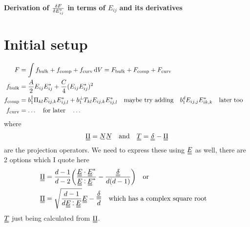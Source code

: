 \documentclass{article}
\newcommand\barbelow[1]{\stackunder[1.2pt]{$#1$}{\rule{1.5ex}{.1ex}}}
\newcommand{\su}[1]{\barbelow{#1}}
\newcommand{\du}[1]{\barbelow{\barbelow{#1}}}
\def\onedot{$\mathsurround0pt\ldotp$}
\def\cddot{\mathbin{
    \vcenter{\baselineskip1ex \vspace{-0.1ex}\hbox{\onedot}\hbox{\onedot}}
}}
\begin{document}
\begin{center}
    \LARGE
    \textbf{Derivation of $\fdv{F}{E_{ij}^*}$ in terms of $E_{ij}$ and its derivatives}
\end{center}
\vspace{1em}
\section{Initial setup}
\begin{align}
    F & = \int f_\text{bulk} + f_\text{comp} + f_\text{curv} \dd{V} = F_\text{bulk} + F_\text{comp} + F_\text{curv}\\
    f_\text{bulk} & = \frac{A}{2} E_{ij}E_{ij}^* + \frac{C}{4} (E_{ij}E_{ij}^*)^2 \\
    f_\text{comp} & = b_1^\parallel \Pi_{kl} E_{ij,k}E_{ij,l}^* + b_1^\perp T_{kl} E_{ij,k}E_{ij,l}^* \qq{maybe try adding} b_1^d E_{ij,j}E_{ik,k}^* \qq{later too} \\
    f_\text{curv} & = \ldots \qq{for later} \ldots \\
\end{align}
where
\begin{align}
    \du{\Pi} = \su{N} \su{N} && \text{and} && \du{T} = \du{\delta} - \du{\Pi}
\end{align}
are the projection operators. We need to express these using $\du{E}$ as well, there are 2 options which I quote here
\begin{align}
    \du{\Pi} & = \frac{d-1}{d-2}\qty(\frac{\du{E} \cdot \du{E}^*}{\du{E} \cddot \du{E}^*} - \frac{\du{\delta}}{d(d-1)}) \qq{or} \label{eq:piex1}\\
    \du{\Pi} & = \sqrt{\frac{d-1}{d \du{E} \cddot \du{E}}} \du{E} - \frac{\du{\delta}}{d} \label{eq:piex2} \qq{which has a complex square root}
\end{align}
$\du{T}$ just being calculated from $\du{\Pi}$.
\end{document}
